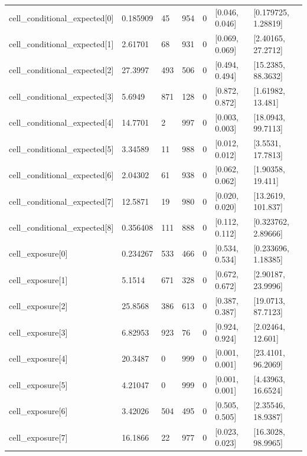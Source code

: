 \begin{longtable}
{}cell\_\allowbreak{}conditional\_\allowbreak{}expected[0] & 0.185909 & 45 & 954 & 0 & [0.046, 0.046] & [0.179725, 1.28819] \\
{}cell\_\allowbreak{}conditional\_\allowbreak{}expected[1] & 2.61701 & 68 & 931 & 0 & [0.069, 0.069] & [2.40165, 27.2712] \\
{}cell\_\allowbreak{}conditional\_\allowbreak{}expected[2] & 27.3997 & 493 & 506 & 0 & [0.494, 0.494] & [15.2385, 88.3632] \\
{}cell\_\allowbreak{}conditional\_\allowbreak{}expected[3] & 5.6949 & 871 & 128 & 0 & [0.872, 0.872] & [1.61982, 13.481] \\
{}cell\_\allowbreak{}conditional\_\allowbreak{}expected[4] & 14.7701 & 2 & 997 & 0 & [0.003, 0.003] & [18.0943, 99.7113] \\
{}cell\_\allowbreak{}conditional\_\allowbreak{}expected[5] & 3.34589 & 11 & 988 & 0 & [0.012, 0.012] & [3.5531, 17.7813] \\
{}cell\_\allowbreak{}conditional\_\allowbreak{}expected[6] & 2.04302 & 61 & 938 & 0 & [0.062, 0.062] & [1.90358, 19.411] \\
{}cell\_\allowbreak{}conditional\_\allowbreak{}expected[7] & 12.5871 & 19 & 980 & 0 & [0.020, 0.020] & [13.2619, 101.837] \\
{}cell\_\allowbreak{}conditional\_\allowbreak{}expected[8] & 0.356408 & 111 & 888 & 0 & [0.112, 0.112] & [0.323762, 2.89666] \\
{}cell\_\allowbreak{}exposure[0] & 0.234267 & 533 & 466 & 0 & [0.534, 0.534] & [0.233696, 1.18385] \\
{}cell\_\allowbreak{}exposure[1] & 5.1514 & 671 & 328 & 0 & [0.672, 0.672] & [2.90187, 23.9996] \\
{}cell\_\allowbreak{}exposure[2] & 25.8568 & 386 & 613 & 0 & [0.387, 0.387] & [19.0713, 87.7123] \\
{}cell\_\allowbreak{}exposure[3] & 6.82953 & 923 & 76 & 0 & [0.924, 0.924] & [2.02464, 12.601] \\
{}cell\_\allowbreak{}exposure[4] & 20.3487 & 0 & 999 & 0 & [0.001, 0.001] & [23.4101, 96.2069] \\
{}cell\_\allowbreak{}exposure[5] & 4.21047 & 0 & 999 & 0 & [0.001, 0.001] & [4.43963, 16.6524] \\
{}cell\_\allowbreak{}exposure[6] & 3.42026 & 504 & 495 & 0 & [0.505, 0.505] & [2.35546, 18.9387] \\
{}cell\_\allowbreak{}exposure[7] & 16.1866 & 22 & 977 & 0 & [0.023, 0.023] & [16.3028, 98.9965] \\

\end{longtable}
